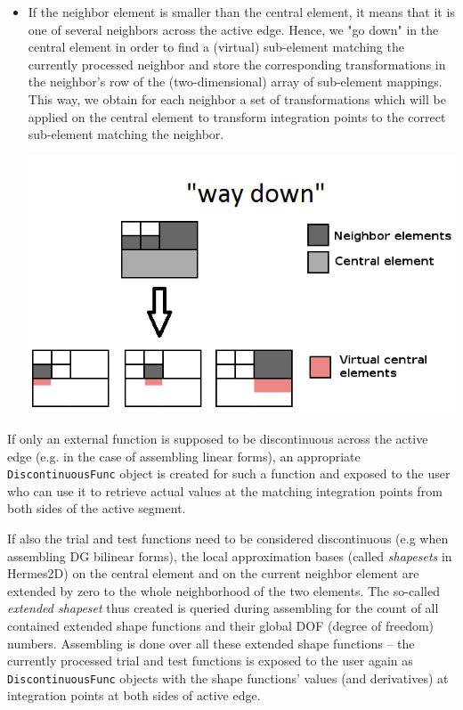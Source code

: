 \begin{itemize}
  \item If the neighbor element is smaller than the central element, it means that it is one of several neighbors across
  the active edge. Hence, we "go down" in the central element in order to find a (virtual) sub-element matching the 
  currently processed neighbor and store the corresponding transformations in the neighbor's row of the
  (two-dimensional) array of sub-element mappings. This way, we obtain for each neighbor a set of
  transformations which will be applied on the central element to transform integration points to the correct
  sub-element matching the neighbor.

\begin{minipage}{\linewidth}
    \centering
    \includegraphics[scale=.6]{way_down2}
\end{minipage}

\end{itemize}

If only an external function is supposed to be discontinuous across the active edge (e.g. in the case of assembling
linear forms), an appropriate \linebreak\lstinline[basicstyle=\ttfamily]{DiscontinuousFunc} object is created for such a
function and exposed to the user who can use it to retrieve actual values at the matching integration points from both
sides of the active segment.

If also the trial and test functions need to be considered discontinuous (e.g when assembling DG bilinear forms), the
local approximation bases (called \textit{shapesets} in Hermes2D) on the central element and on the current
neighbor element are extended by zero to the whole neighborhood of the two elements.
The so-called \textit{extended shapeset} thus created is 
queried during assembling for the count of all contained extended shape functions and their global DOF (degree of
freedom) numbers.
Assembling is done over all these extended shape functions -- the currently processed trial and test functions
is exposed to the user again as
\lstinline[basicstyle=\ttfamily]{DiscontinuousFunc} objects with the shape functions' values (and derivatives) at
integration points at both sides of active edge.
  
